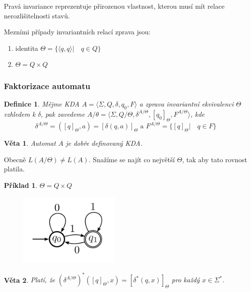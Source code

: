 \documentclass[10pt,a4paper]{article}
\theoremstyle{note}
\newtheorem{veta}{Věta}
\newtheorem{definice}{Definice}
\newtheorem{priklad}{Příklad}
\begin{document}
Pravá invariance reprezentuje přirozenou vlastnost, kterou musí mít relace nerozlišitelnosti stavů.

Mezními případy invariantních relací zprava jsou:
\begin{enumerate}
\item 
identita $\Theta = \lbrace \langle q,q \rangle | \quad q \in Q \rbrace$
\item
$\Theta = Q \times Q$
\end{enumerate}

\subsubsection{Faktorizace automatu}

\begin{definice}
Mějme KDA $A = \langle \Sigma, Q, \delta, q_{0}, F \rangle$ a zprava invariantní ekvivalenci $\Theta$ vzhledem k
$\delta$, pak zavedeme $A/\theta = \langle \Sigma, Q/\Theta, \delta^{A/\Theta}, [q_{0}]_{\Theta}, F^{A/\Theta} \rangle$, kde
$$\delta^{A/\Theta} = ([q]_{\Theta}, a) = [\delta(q, a)]_{\Theta} \text{ a } F^{A/\Theta} = \lbrace [q]_{\Theta} | \quad q \in F \rbrace$$
\end{definice}

\begin{veta}\label{veta-aut}
Automat $A$ je dobře definovaný KDA.
\end{veta}



Obecně $L(A/\Theta) \neq L(A)$. Snažíme se najít co největší $\Theta$, tak aby tato rovnost platila.

\begin{priklad}
$\Theta = Q \times Q$

\begin{figure}[H]
			\centering
			\includegraphics[width=5cm]{img/min1.png}
			\end{figure}

\end{priklad}

\begin{veta}\label{veta-x2}
Platí, že $(\delta^{A/\Theta})^*([q]_\Theta,x)=[\delta^*(q,x)]_\Theta$ pro každý $x \in \Sigma^*$.
\end{veta}
\end{document}
